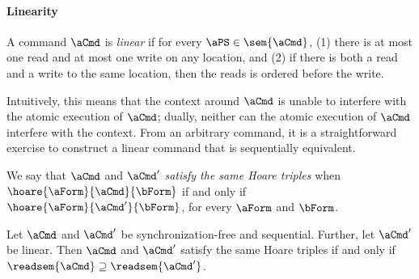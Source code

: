 \paragraph{Linearity}
A command $\aCmd$ is \emph{linear} if for every $\aPS\in\sem{\aCmd}$, (1) there is
at most one read and at most one write on any location, and (2) if there is
both a read and a write to the same location, then the reads is ordered
before the write.

Intuitively, this means that the context around $\aCmd$ is unable to
interfere with the atomic execution of $\aCmd$; dually, neither can the
atomic execution of $\aCmd$ interfere with the context.  From an arbitrary
command, it is a straightforward exercise to construct a linear command that
is sequentially equivalent.

We say that $\aCmd$ and $\aCmd'$ \emph{satisfy the same Hoare triples} when
$\hoare{\aForm}{\aCmd}{\bForm}$ if and only if
$\hoare{\aForm}{\aCmd'}{\bForm}$, for every $\aForm$ and $\bForm$.

\begin{corollary}\label{seqcompleteness}
  Let $\aCmd$ and $\aCmd'$ be synchronization-free and sequential.  Further,
  let $\aCmd'$ be linear.
  Then $\aCmd$ and $\aCmd'$ satisfy the same Hoare
  triples if and only if $\readsem{\aCmd} \supseteq \readsem{\aCmd'}$.
%    
\end{corollary}

